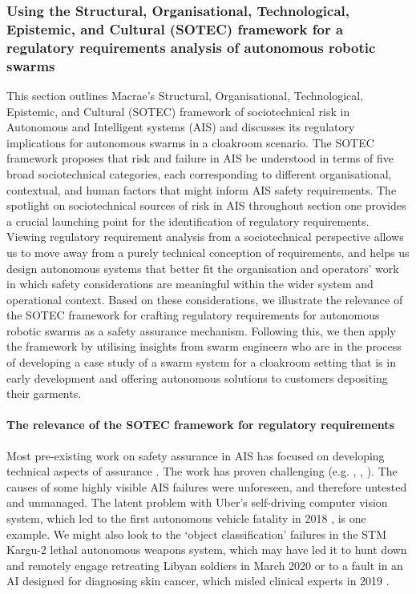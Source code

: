 \documentclass[lettersize,journal]{IEEEtran}
\begin{document}

\subsubsection{Using the Structural, Organisational, Technological, Epistemic, and Cultural (SOTEC) framework for a regulatory requirements analysis of autonomous robotic swarms}\label{regulations-r}

This section outlines Macrae’s \cite{macrae2021learning} Structural, Organisational, Technological, Epistemic, and Cultural (SOTEC) framework of sociotechnical risk in Autonomous and Intelligent systems (AIS) and discusses its regulatory implications for autonomous swarms in a cloakroom scenario. The SOTEC framework proposes that risk and failure in AIS be understood in terms of five broad sociotechnical categories, each corresponding to different organisational, contextual, and human factors that might inform AIS safety requirements. The spotlight on sociotechnical sources of risk in AIS throughout section one provides a crucial launching point for the identification of regulatory requirements. Viewing regulatory requirement analysis from a sociotechnical perspective allows us to move away from a purely technical conception of requirements, and helps us design autonomous systems that better fit the organisation and operators’ work in which safety considerations are meaningful within the wider system and operational context. Based on these considerations, we illustrate the relevance of the SOTEC framework for crafting regulatory requirements for autonomous robotic swarms as a safety assurance mechanism. Following this, we then apply the framework by utilising insights from swarm engineers who are in the process of developing a case study of a swarm system for a cloakroom setting that is in early development and offering autonomous solutions to customers depositing their garments.
\\
\paragraph*{The relevance of the SOTEC framework for regulatory requirements}

Most pre-existing work on safety assurance in AIS has focused on developing technical aspects of assurance \cite{brundage2020toward}. The work has proven challenging (e.g. \cite{karvonen2020safety}, \cite{thieme2021proceedings}, \cite{sanchezexplainable}). The causes of some highly visible AIS failures were unforeseen, and therefore untested and unmanaged. The latent problem with Uber’s self-driving computer vision system, which led to the first autonomous vehicle fatality in 2018 \cite{Niedermeyer}, is one example. We might also look to the `object classification’ failures in the STM Kargu-2 lethal autonomous weapons system, which may have led it to hunt down and remotely engage retreating Libyan soldiers in March 2020 \cite{nasu2021kargu} or to a fault in an AI designed for diagnosing skin cancer, which misled clinical experts in 2019 \cite{tschandl2020human}.
\end{document}
